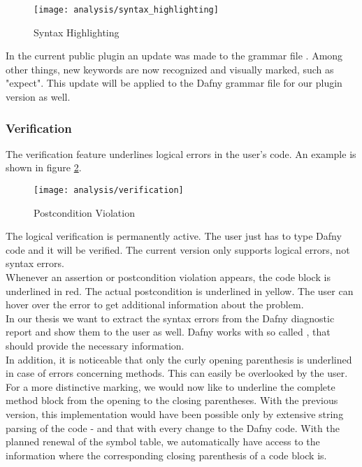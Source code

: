 \begin{figure}[H]
    \centering
    \texttt{[image: analysis/syntax\_highlighting]}
    \caption{Syntax Highlighting}
    \label{fig:analysis_syntax_highlighting}
\end{figure}

In the current public plugin an update was made to the grammar file \cite{syntax_update}.
Among other things, new keywords are now recognized and visually marked, such as "expect".
This update will be applied to the Dafny grammar file for our plugin version as well.

\subsubsection{Verification}
The verification feature underlines logical errors in the user's code.
An example is shown in figure \ref{fig:analysis_verification}.

\begin{figure}[H]
    \centering
    \texttt{[image: analysis/verification]}
    \caption{Postcondition Violation}
    \label{fig:analysis_verification}
\end{figure}

The logical verification is permanently active.
The user just has to type Dafny code and it will be verified.
The current version only supports logical errors, not syntax errors.\\

Whenever an assertion or postcondition violation appears, the code block is underlined in red.
The actual postcondition is underlined in yellow.
The user can hover over the error to get additional information about the problem. \\

In our thesis we want to extract the syntax errors from the Dafny diagnostic report and show them to the user as well.
Dafny works with so called , that should provide the necessary information.\\

In addition, it is noticeable that only the curly opening parenthesis is underlined in case of errors concerning methods.
This can easily be overlooked by the user.
For a more distinctive marking, we would now like to underline the complete method block from the opening to the closing parentheses.
With the previous version, this implementation would have been possible only by extensive string parsing of the code - and that with every change to the Dafny code.
With the planned renewal of the symbol table, we automatically have access to the information where the corresponding closing parenthesis of a code block is.

